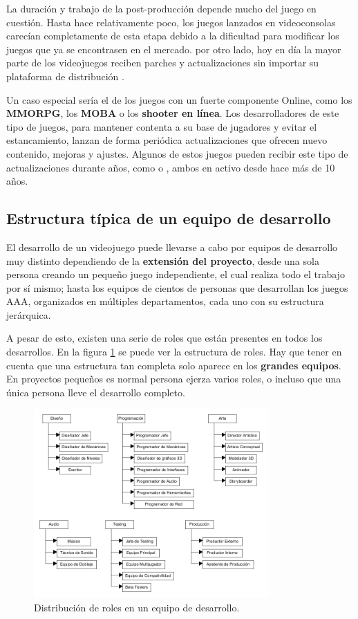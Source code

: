 La duración y trabajo de la post-producción depende mucho del juego en cuestión. Hasta hace relativamente poco, los juegos lanzados en videoconsolas carecían completamente de esta etapa debido a la dificultad para modificar los juegos que ya se encontrasen en el mercado. por otro lado, hoy en día la mayor parte de los videojuegos reciben parches y actualizaciones sin importar su plataforma de distribución \cite{development_and_production}.

Un caso especial sería el de los juegos con un fuerte componente Online, como los \textbf{MMORPG}, los \textbf{MOBA} o los \textbf{shooter en línea}. Los desarrolladores de este tipo de juegos, para mantener contenta a su base de jugadores y evitar el estancamiento, lanzan de forma periódica actualizaciones que ofrecen nuevo contenido, mejoras y ajustes. Algunos de estos juegos pueden recibir este tipo de actualizaciones durante años, como  o , ambos en activo desde hace más de 10 años.

\subsection{Estructura típica de un equipo de desarrollo}
El desarrollo de un videojuego puede llevarse a cabo por equipos de desarrollo muy distinto dependiendo de la \textbf{extensión del proyecto}, desde una sola persona creando un pequeño juego independiente, el cual realiza todo el trabajo por sí mismo; hasta los equipos de cientos de personas que desarrollan los juegos AAA, organizados en múltiples departamentos, cada uno con su estructura jerárquica.

A pesar de esto, existen una serie de roles que están presentes en todos los desarrollos. En la figura \ref{table-roles} se puede ver la estructura de roles. Hay que tener en cuenta que una estructura tan completa solo aparece en los \textbf{grandes equipos}. En proyectos pequeños es normal persona ejerza varios roles, o incluso que una única persona lleve el desarrollo completo.

\begin{figure}[h]
    \centering
    \includegraphics[width=0.8\textwidth]{images/estadodelarte/desarrollo/table-roles}
    \caption{Distribución de roles en un equipo de desarrollo.}
    \label{table-roles}
\end{figure}

